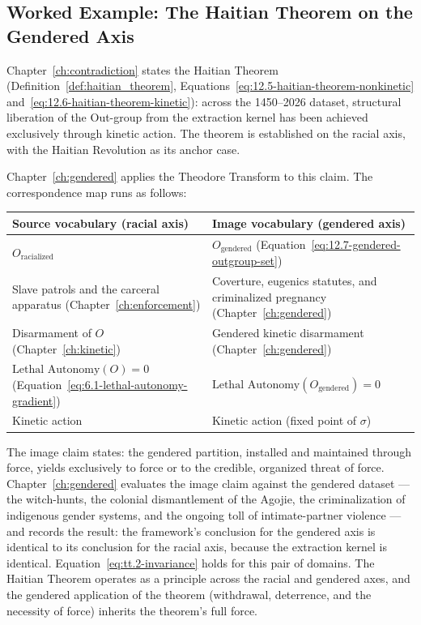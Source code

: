 \subsection{Worked Example: The Haitian Theorem on the Gendered Axis}

Chapter~\ref{ch:contradiction} states the Haitian Theorem
(Definition~\ref{def:haitian_theorem}, Equations~\ref{eq:12.5-haitian-theorem-nonkinetic}
and~\ref{eq:12.6-haitian-theorem-kinetic}): across the 1450--2026 dataset, structural liberation
of the Out-group from the extraction kernel has been achieved exclusively through kinetic action.
The theorem is established on the racial axis, with the Haitian Revolution as its anchor case.

Chapter~\ref{ch:gendered} applies the Theodore Transform to this claim. The correspondence map
runs as follows:

\begin{center}
\renewcommand{\arraystretch}{1.3}
\begin{tabular}{>{\raggedright}p{5.4cm} >{\raggedright\arraybackslash}p{8.0cm}}
\toprule
\textbf{Source vocabulary (racial axis)} & \textbf{Image vocabulary (gendered axis)} \\
\midrule
$O_{\text{racialized}}$ & $O_{\text{gendered}}$ (Equation~\ref{eq:12.7-gendered-outgroup-set}) \\
Slave patrols and the carceral apparatus (Chapter~\ref{ch:enforcement}) &
Coverture, eugenics statutes, and criminalized pregnancy (Chapter~\ref{ch:gendered}) \\
Disarmament of $O$ (Chapter~\ref{ch:kinetic}) &
Gendered kinetic disarmament (Chapter~\ref{ch:gendered}) \\
$\text{Lethal Autonomy}(O) = 0$ (Equation~\ref{eq:6.1-lethal-autonomy-gradient}) &
$\text{Lethal Autonomy}(O_{\text{gendered}}) = 0$ \\
Kinetic action & Kinetic action (fixed point of $\sigma$) \\
\bottomrule
\end{tabular}
\end{center}

The image claim states: the gendered partition, installed and maintained through force, yields
exclusively to force or to the credible, organized threat of force. Chapter~\ref{ch:gendered}
evaluates the image claim against the gendered dataset --- the witch-hunts, the colonial
dismantlement of the Agojie, the criminalization of indigenous gender systems, and the ongoing
toll of intimate-partner violence --- and records the result: the framework's conclusion for the
gendered axis is identical to its conclusion for the racial axis, because the extraction kernel is
identical. Equation~\ref{eq:tt.2-invariance} holds for this pair of domains. The Haitian Theorem
operates as a principle across the racial and gendered axes, and the gendered application of the
theorem (withdrawal, deterrence, and the necessity of force) inherits the theorem's full force.

